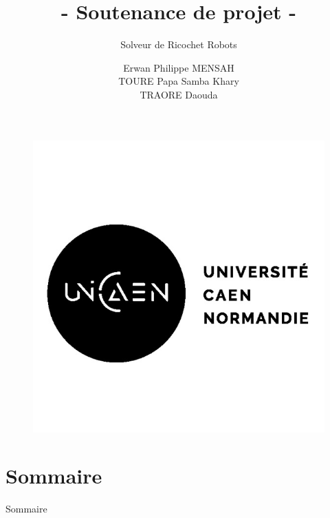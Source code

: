 \documentclass{beamer}
\title{- Soutenance de projet -  }
\subtitle{Solveur de Ricochet Robots}
\author{Erwan Philippe MENSAH  \\ TOURE Papa Samba Khary \\ TRAORE Daouda}
\institute{L2 Informatique \\ Groupe 2A}
\date{}
\begin{document}
\begin{frame}
	\begin{figure}
        \includegraphics[scale=0.14]{Images/logo.jpg}
	\end{figure}
	\titlepage
\end{frame}

\section{Sommaire}
    \begin{frame}{Sommaire}
        \tableofcontents
    \end{frame}
\end{document}
